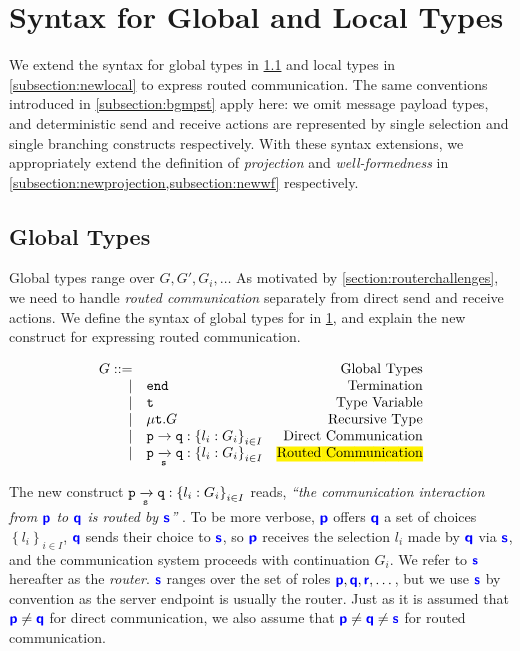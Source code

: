 \section{Syntax for Global and Local Types}
\label{section:syntax}

We extend the syntax for global types
in \cref{subsection:newglobal} and
local types in \cref{subsection:newlocal}
to express routed communication.
The same conventions introduced in \cref{subsection:bgmpst}
apply here: 
we omit message payload types,
and deterministic send and receive actions
are represented by single selection and
single branching constructs respectively.
With these syntax extensions, we appropriately extend
the definition of \textit{projection} and 
\textit{well-formedness} in 
\cref{subsection:newprojection,subsection:newwf}
respectively.

\subsection{Global Types}
\label{subsection:newglobal}

Global types range over $G, G', G_i, \dots$
As motivated by \cref{section:routerchallenges},
we need to handle \textit{routed communication} separately
from direct send and receive actions.
We define the syntax of global types for \newtheory 
in \cref{fig:newsyntaxglobal}, and explain the 
new construct for expressing routed communication.

\begin{figure}[!h]
\doublespacing
\[
\begin{array}{rlr}
G ::= & & \text{Global Types} \\
\mid & \tend & \text{Termination} \\
\mid & \trecvar & \text{Type Variable} \\
\mid & \trec{G} & \text{Recursive Type} \\
\mid & \gcomm{p}{q}{l_i: G_i}{i \in I} & \text{Direct Communication} \\
\mid & \groute{p}{q}{s}{l_i: G_i}{i \in I}
	& \text{\hl{Routed Communication}} \\
\end{array}
\]
\singlespacing
{}
\label{fig:newsyntaxglobal}
\end{figure}

The new construct $\groute{p}{q}{s}{l_i: G_i}{i \in I}$ reads, 
\textit{
``the communication interaction 
from $\role{p}$ to $\role{q}$
is routed by $\role{s}$''
}.
To be more verbose,
$\role{p}$ offers $\role{q}$ a set of choices
$\left\{l_i\right\}_{i \in I}$,
$\role{q}$ sends their choice to
$\role{s}$, so $\role{p}$ receives the
selection $l_i$ made by $\role{q}$ via $\role{s}$,
and the communication system proceeds with continuation $G_i$.
We refer to $\role{s}$ hereafter as the \textit{router}.
$\role{s}$ ranges over the set of roles 
$\role{p},\role{q},\role{r},\dots$,
but we use $\role{s}$ by convention as the server endpoint
is usually the router.
Just as it is assumed that $\role{p} \neq \role{q}$ for
direct communication,
we also assume that
$\role{p} \neq \role{q} \neq \role{s}$ for routed communication.

